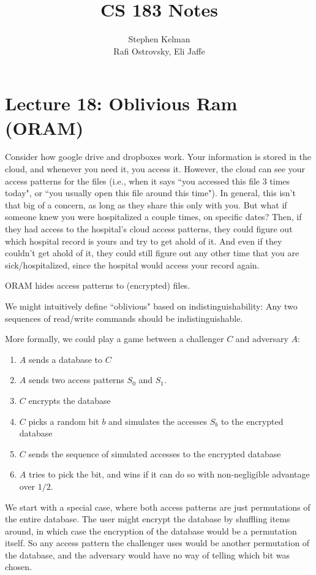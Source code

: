 \documentclass[11pt]{article}
\title{CS 183 Notes}
\author{Stephen Kelman\\ Rafi Ostrovsky, Eli Jaffe}
\begin{document}
\section{Lecture 18: Oblivious Ram (ORAM)}
Consider how google drive and dropboxes work.
Your information is stored in the cloud, and whenever you need it, you access it.
However, the cloud can see your access patterns for the files (i.e., when it says ``you accessed this file 3 times today", or ``you usually open this file around this time").
In general, this isn't that big of a concern, as long as they share this only with you.
But what if someone knew you were hospitalized a couple times, on specific dates?
Then, if they had access to the hospital's cloud access patterns, they could figure out which hospital record is yours and try to get ahold of it.
And even if they couldn't get ahold of it, they could still figure out any other time that you are sick/hospitalized, since the hospital would access your record again.

ORAM hides access patterns to (encrypted) files.\medskip

We might intuitively define ``oblivious" based on indistinguishability:
Any two sequences of read/write commands should be indistinguishable.

More formally, we could play a game between a challenger \(C\) and adversary \(A\):
\begin{enumerate}
\item \(A\) sends a database to \(C\)
\item \(A\) sends two access patterns \(S_0\) and \(S_1\).
\item \(C\) encrypts the database
\item \(C\) picks a random bit \(b\) and simulates the accesses \(S_b\) to the encrypted database
\item \(C\) sends the sequence of simulated accesses to the encrypted database
\item \(A\) tries to pick the bit, and wins if it can do so with non-negligible advantage over \(1/2\).
\end{enumerate}

We start with a special case, where both access patterns are just permutations of the entire database.
The user might encrypt the database by shuffling items around, in which case the encryption of the database would be a permutation itself.
So any access pattern the challenger uses would be another permutation of the database, and the adversary would have no way of telling which bit was chosen.\medskip
\end{document}
